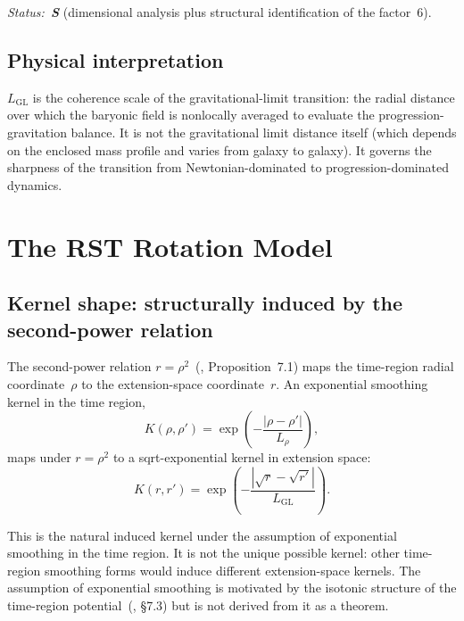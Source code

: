 \documentclass[11pt,a4paper]{article}
\begin{document}
\textit{Status:~\textbf{S}} (dimensional analysis plus structural identification of the factor~6).

\subsection{Physical interpretation}

$L_{\mathrm{GL}}$ is the coherence scale of the gravitational-limit transition: the radial distance over which the baryonic field is nonlocally averaged to evaluate the progression-gravitation balance.
It is not the gravitational limit distance itself (which depends on the enclosed mass profile and varies from galaxy to galaxy).
It governs the sharpness of the transition from Newtonian-dominated to progression-dominated dynamics.

\section{The RST Rotation Model}
\label{sec:model}

\subsection{Kernel shape: structurally induced by the second-power relation}
\label{sec:kernel}

The second-power relation $r = \rho^2$~(\cite{Wells2026b}, Proposition~7.1) maps the time-region radial coordinate~$\rho$ to the extension-space coordinate~$r$.
An exponential smoothing kernel in the time region,
\begin{equation}
K(\rho, \rho') = \exp\!\left(-\frac{|\rho - \rho'|}{L_\rho}\right),
\end{equation}
maps under $r = \rho^2$ to a sqrt-exponential kernel in extension space:
\begin{equation}
\label{eq:kernel}
K(r, r') = \exp\!\left(-\frac{|\sqrt{r} - \sqrt{r'}|}{L_{\mathrm{GL}}}\right).
\end{equation}

This is the natural induced kernel under the assumption of exponential smoothing in the time region.
It is not the unique possible kernel: other time-region smoothing forms would induce different extension-space kernels.
The assumption of exponential smoothing is motivated by the isotonic structure of the time-region potential~(\cite{Wells2026b}, \S7.3) but is not derived from it as a theorem.
\end{document}
